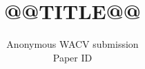 \documentclass[10pt,twocolumn,letterpaper]{article}
\title{@@TITLE@@}
\author{Anonymous WACV submission\\Paper ID \wacvPaperID}
\begin{document}
\maketitle

\begin{abstract}

\end{abstract}







{\small


}

\clearpage
\appendix

\end{document}

